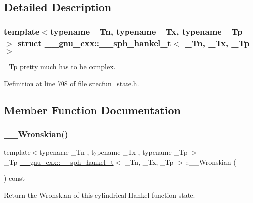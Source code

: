\subsection{Detailed Description}
\subsubsection*{template$<$typename \+\_\+\+Tn, typename \+\_\+\+Tx, typename \+\_\+\+Tp$>$\newline
struct \+\_\+\+\_\+gnu\+\_\+cxx\+::\+\_\+\+\_\+sph\+\_\+hankel\+\_\+t$<$ \+\_\+\+Tn, \+\_\+\+Tx, \+\_\+\+Tp $>$}

\+\_\+\+Tp pretty much has to be complex. 

Definition at line 708 of file specfun\+\_\+state.\+h.



\subsection{Member Function Documentation}
\mbox{\label{struct____gnu__cxx_1_1____sph__hankel__t_a401ba4615906dfc075be66e7048da8c2}} 
\subsubsection{\texorpdfstring{\+\_\+\+\_\+\+Wronskian()}{\_\_Wronskian()}}
{\footnotesize\ttfamily template$<$typename \+\_\+\+Tn , typename \+\_\+\+Tx , typename \+\_\+\+Tp $>$ \\
\+\_\+\+Tp \hyperlink{struct____gnu__cxx_1_1____sph__hankel__t}{\+\_\+\+\_\+gnu\+\_\+cxx\+::\+\_\+\+\_\+sph\+\_\+hankel\+\_\+t}$<$ \+\_\+\+Tn, \+\_\+\+Tx, \+\_\+\+Tp $>$\+::\+\_\+\+\_\+\+Wronskian (\begin{DoxyParamCaption}{ }\end{DoxyParamCaption}) const\hspace{0.3cm}{\ttfamily [inline]}}



Return the Wronskian of this cylindrical Hankel function state. 



